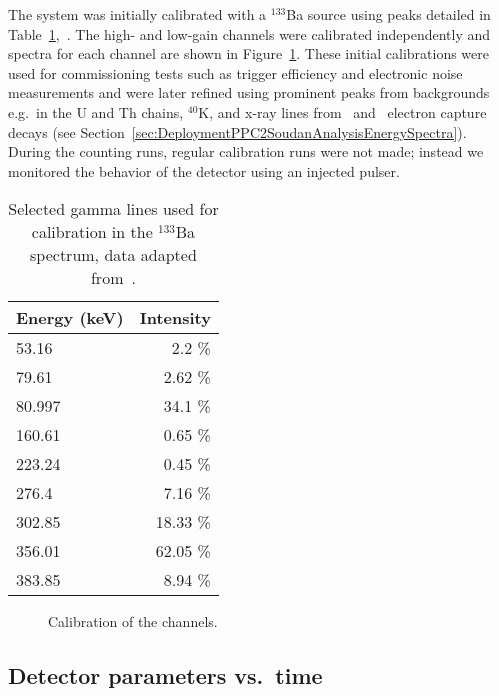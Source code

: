 	The system was initially calibrated with a $^{133}$Ba source using peaks detailed in Table~\ref{tab:Ba133Peaks},~\cite{Rab1995491}.  The high- and low-gain channels were calibrated independently and spectra for each channel are shown in Figure~\ref{fig:PPC2Calibration}.  These initial calibrations were used for commissioning tests such as trigger efficiency and electronic noise measurements and were later refined using prominent peaks from backgrounds e.g.~in the U and Th chains, $^{40}$K, and x-ray lines from \gersixeight~and \znsixfive~electron capture decays (see Section~\ref{sec:DeploymentPPC2SoudanAnalysisEnergySpectra}).  During the counting runs, regular calibration runs were not made; instead we monitored the behavior of the detector using an injected pulser.  

				\begin{table}
					\centering
					\begin{tabular}{l|r}
						Energy (keV) & Intensity \\
						\hline
						    53.16 	 &     2.2 \% \\ 
						    79.61 	 &     2.62 \% \\
						    80.997 	 &    34.1 \%\\
						   160.61 	 &     0.65 \%\\
						   223.24 	 &   0.45 \% \\
						   276.4 	 &     7.16 \% \\
						   302.85 	 &   18.33 \% \\
						   356.01 	 &    62.05 \% \\
						   383.85 	  &    8.94 \% \\
						\hline
					\end{tabular}
					\caption{Selected gamma lines used for calibration in the $^{133}$Ba spectrum, 
					data adapted from~\cite{Rab1995491}.}
					\label{tab:Ba133Peaks}
				\end{table}	
						
				\begin{figure}
					\centering
					\caption{Calibration of the channels.}
					\label{fig:PPC2Calibration}
				\end{figure}

		\subsection{Detector parameters vs.~time}	
		\label{sec:PPC2DetParsVsTime}
		
